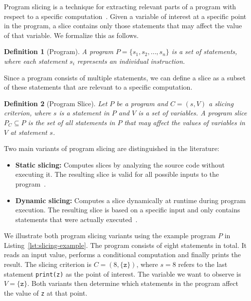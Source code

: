 \documentclass[
12pt,
fancyheadings,
a4paper,
twoside,
BCOR=0.7cm,
nobcorignoretitle,
grayscalebody,
]{stsreprt}
\newtheorem{definition}{Definition}[chapter]
\begin{document}
Program slicing is a technique for extracting relevant parts of a program with respect to a
specific computation~\cite{weiser1981program, weiser1984program}.
Given a variable of interest at a specific point in the program, a slice contains only those
statements that may affect the value of that variable.
We formalize this as follows.

\begin{definition}[Program]
\label{def:program}
A program $P = \{s_1, s_2, \dots, s_n\}$ is a set of statements, where each statement $s_i$
represents an individual instruction.
\end{definition}

Since a program consists of multiple statements, we can define a slice as a subset of these
statements that are relevant to a specific computation.

\begin{definition}[Program Slice]
\label{def:program_slice}
Let $P$ be a program and $C = (s, V)$ a slicing criterion, where $s$ is a statement in $P$ and $V$
is a set of variables.
A program slice $P_C \subseteq P$ is the set of all statements in $P$ that may affect the values of
variables in $V$ at statement $s$.
\end{definition}

Two main variants of program slicing are distinguished in the literature:
\begin{itemize}
    \item \textbf{Static slicing:} Computes slices by analyzing the source code without executing it.
        The resulting slice is valid for all possible inputs to the
    program~\cite{weiser1984program}.
    \item \textbf{Dynamic slicing:} Computes a slice dynamically at runtime during program execution.
        The resulting slice is based on a specific input and only contains statements that were
    actually executed~\cite{korel1988dynamic}.
\end{itemize}
We illustrate both program slicing variants using the example program $P$ in
Listing~\ref{lst:slicing-example}. 
The program consists of eight statements in total. It reads an input value, performs a conditional
computation and finally prints the result.
The slicing criterion is $C = (8, \{\texttt{z}\})$, where $s = 8$ refers to the last statement
\texttt{print(z)} as the point of interest.
The variable we want to observe is $V = \{\texttt{z}\}$.
Both variants then determine which statements in the program affect the value of \texttt{z} at that
point.
\end{document}
